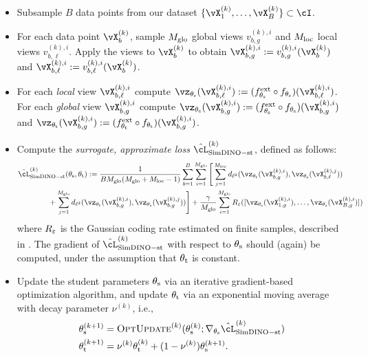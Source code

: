 \documentclass[\toplevelprefix/book-main.tex]{subfiles}
\begin{document}
\begin{itemize}
    \item Subsample \(B\) data points from our dataset \(\{\vX_{1}^{(k)}, \dots, \vX_{B}^{(k)}\} \subset \cI\).
    \item For each data point \(\vX_{b}^{(k)}\), sample \(M_{\mathrm{glo}}\) global views \(v_{b, g}^{(k), i}\) and \(M_{\mathrm{loc}}\) local views \(v_{b, \ell}^{(k), i}\). Apply the views to \(\vX_{b}^{(k)}\) to obtain \(\vX_{b, g}^{(k), i} := v_{b, g}^{(k), i}(\vX_{b}^{(k)})\) and \(\vX_{b, \ell}^{(k), i} := v_{b, \ell}^{(k), i}(\vX_{b}^{(k)})\).
    \item For each \textit{local} view \(\vX_{b, \ell}^{(k), i}\) compute \(\vz_{\theta_{\student}}(\vX_{b, \ell}^{(k), i}) := (f_{\theta_{\student}}^{\ext} \circ f_{\theta_{\student}})(\vX_{b, \ell}^{(k), i})\). For each \textit{global} view \(\vX_{b, g}^{(k), i}\) compute \(\vz_{\theta_{\student}}(\vX_{b, g}^{(k), i}) := (f_{\theta_{\student}}^{\ext} \circ f_{\theta_{\student}})(\vX_{b, g}^{(k), i})\) and \(\vz_{\theta_{\teacher}}(\vX_{b, g}^{(k), i}) := (f_{\theta_{\teacher}}^{\ext} \circ f_{\theta_{\teacher}})(\vX_{b, g}^{(k), i})\).
    \item Compute the \textit{surrogate, approximate loss} \(\hat{\cL}_{\simdino-\student\teacher}^{(k)}\), defined as follows: 
    \begin{align}\label{eq:simdino_loss_teacherstudent_empirical}
        &\hat{\cL}_{\simdino{}-\student\teacher}^{(k)}(\theta_{\student}, \theta_{\teacher}) :=
        \frac{1}{BM_{\glo}(M_{\glo} + M_{\loc} - 1)}\sum_{b = 1}^{B}\sum_{i = 1}^{M_{\glo}}\Bigg[\sum_{j = 1}^{M_{\loc}}d_{\ell^{2}}(\vz_{\theta_{\teacher}}(\vX_{b, g}^{(k), i}), \vz_{\theta_{\student}}(\vX_{b, \ell}^{(k), j})) \\ 
        &\qquad \qquad + \sum_{j = 1}^{M_{\glo}}d_{\ell^{2}}(\vz_{\theta_{\teacher}}(\vX_{b, g}^{(k), i}), \vz_{\theta_{\student}}(\vX_{b, g}^{(k), j}))\Bigg] + \frac{\gamma}{M_{\glo}}\sum_{i = 1}^{M_{\glo}}R_{\eps}([\vz_{\theta_{\student}}(\vX_{1, g}^{(k), i}), \dots, \vz_{\theta_{\student}}(\vX_{B, g}^{(k), i})])\nonumber
    \end{align}
    where \(R_{\varepsilon}\) is the Gaussian coding rate estimated on finite samples, described in . The gradient of \(\hat{\cL}_{\simdino-\student\teacher}^{(k)}\) with respect to \(\theta_{\mathrm{s}}\) should (again) be computed, under the assumption that \(\theta_{\mathrm{t}}\) is constant.
    \item Update the student parameters \(\theta_{\mathrm{s}}\) via an iterative gradient-based optimization algorithm, and update \(\theta_{\mathrm{t}}\) via an exponential moving average with decay parameter \(\nu^{(k)}\), i.e., 
    \begin{align}
        \theta_{\student}^{(k + 1)}
        &= \textsc{OptUpdate}^{(k)}(\theta_{\student}^{(k)}; \nabla_{\theta_{\student}}\hat{\cL}_{\simdino-\student\teacher}^{(k)}) \\
        \theta_{\teacher}^{(k + 1)}
        &= \nu^{(k)}\theta_{\teacher}^{(k)} + (1 - \nu^{(k)})\theta_{\student}^{(k + 1)}.
    \end{align}
\end{itemize}
\end{document}

